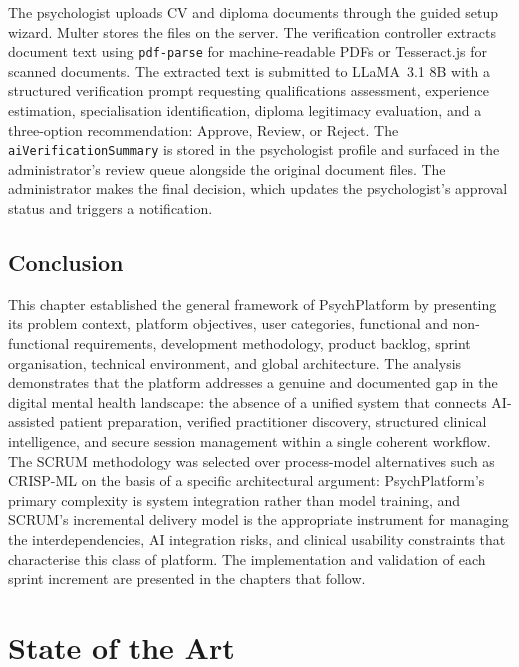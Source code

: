 \documentclass[a4paper,12pt]{report}
\begin{document}
The psychologist uploads CV and diploma documents through the guided setup wizard. Multer stores the files on the server. The verification controller extracts document text using \texttt{pdf-parse} for machine-readable PDFs or Tesseract.js for scanned documents. The extracted text is submitted to LLaMA~3.1 8B with a structured verification prompt requesting qualifications assessment, experience estimation, specialisation identification, diploma legitimacy evaluation, and a three-option recommendation: Approve, Review, or Reject. The \texttt{aiVerificationSummary} is stored in the psychologist profile and surfaced in the administrator's review queue alongside the original document files. The administrator makes the final decision, which updates the psychologist's approval status and triggers a notification.

\section*{Conclusion}
{}

This chapter established the general framework of PsychPlatform by presenting its problem context, platform objectives, user categories, functional and non-functional requirements, development methodology, product backlog, sprint organisation, technical environment, and global architecture. The analysis demonstrates that the platform addresses a genuine and documented gap in the digital mental health landscape: the absence of a unified system that connects AI-assisted patient preparation, verified practitioner discovery, structured clinical intelligence, and secure session management within a single coherent workflow. The SCRUM methodology was selected over process-model alternatives such as CRISP-ML on the basis of a specific architectural argument: PsychPlatform's primary complexity is system integration rather than model training, and SCRUM's incremental delivery model is the appropriate instrument for managing the interdependencies, AI integration risks, and clinical usability constraints that characterise this class of platform. The implementation and validation of each sprint increment are presented in the chapters that follow.



\chapter{State of the Art}
\label{chap:soa}
\end{document}
